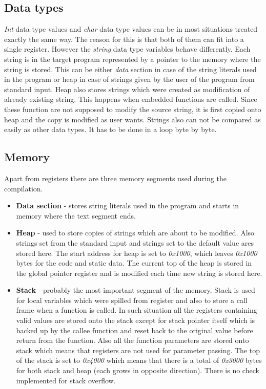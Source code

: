 \subsection{Data types}
\textit{Int} data type values and \textit{char} data type values can be in most situations treated exactly the same way. The reason for this is that both of them can fit into a single register. However the \textit{string} data type variables behave differently. Each string is in the target program represented by a pointer to the memory where the string is stored. This can be either \textit{data} section in case of the string literals used in the program or heap in case of strings given by the user of the program from standard input. Heap also stores strings which were created as modification of already existing string. This happens when embedded functions are called. Since these function are not supposed to modify the source string, it is first copied onto heap and the copy is modified as user wants. Strings also can not be compared as easily as other data types. It has to be done in a loop byte by byte.

\subsection{Memory}
Apart from registers there are three memory segments used during the compilation.
\begin{itemize}
\item \textbf{Data section} - stores string literals used in the program and starts in memory where the text segment ends.
\item \textbf{Heap} - used to store copies of strings which are about to be modified. Also strings set from the standard input and strings set to the default value ares stored here. The start address for heap is set to \textit{0x1000}, which leaves \textit{0x1000} bytes for the code and static data. The current top of the heap is stored in the global pointer register and is modified each time new string is stored here.
\item \textbf{Stack} - probably the most important segment of the memory. Stack is used for local variables which were spilled from register and also to store a call frame when a function is called. In such situation all the registers containing valid values are stored onto the stack except for stack pointer itself which is backed up by the callee function and reset back to the original value before return from the function. Also all the function parameters are stored onto stack which means that registers are not used for parameter passing. The top of the stack is set to \textit{0x4000} which means that there is a total of \textit{0x3000} bytes for both stack and heap (each grows in opposite direction). There is no check implemented for stack overflow.
\end{itemize}


